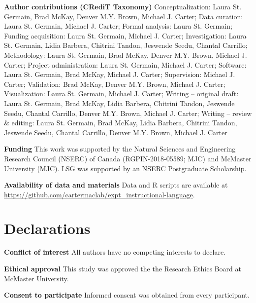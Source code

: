 \documentclass[man,floatsintext,donotrepeattitle,letterpaper,12pt]{apa7}
\begin{document}
\clearpage

\noindent \textbf{Author contributions (CRediT Taxonomy)} \hspace{0.25em} Conceptualization: Laura St. Germain, Brad McKay, Denver M.Y. Brown, Michael J. Carter; Data curation: Laura St. Germain, Michael J. Carter; Formal analysis: Laura St. Germain; Funding acquisition: Laura St. Germain, Michael J. Carter; Investigation: Laura St. Germain, Lidia Barbera, Chitrini Tandon, Jeswende Seedu, Chantal Carrillo; Methodology: Laura St. Germain, Brad McKay, Denver M.Y. Brown, Michael J. Carter; Project administration: Laura St. Germain, Michael J. Carter; Software: Laura St. Germain, Brad McKay, Michael J. Carter; Supervision: Michael J. Carter; Validation: Brad McKay, Denver M.Y. Brown, Michael J. Carter; Visualization: Laura St. Germain, Michael J. Carter; Writing -- original draft: Laura St. Germain, Brad McKay, Lidia Barbera, Chitrini Tandon, Jeswende Seedu, Chantal Carrillo, Denver M.Y. Brown, Michael J. Carter; Writing -- review \& editing: Laura St. Germain, Brad McKay, Lidia Barbera, Chitrini Tandon, Jeswende Seedu, Chantal Carrillo, Denver M.Y. Brown, Michael J. Carter

\noindent \textbf{Funding} \hspace{0.25em} This work was supported by the Natural Sciences and Engineering Research Council (NSERC) of Canada (RGPIN-2018-05589; MJC) and McMaster University (MJC). LSG was supported by an NSERC Postgraduate Scholarship.

\noindent \textbf{Availability of data and materials} \hspace{0.25em} Data and R scripts are available at \url{https://github.com/cartermaclab/expt_instructional-language}.

\section{Declarations}

\noindent \textbf{Conflict of interest} \hspace{0.25em} All authors have no competing interests to declare.

\noindent \noindent \textbf{Ethical approval} \hspace{0.25em} This study was approved the the Research Ethics Board at McMaster University.

\noindent \textbf{Consent to participate} \hspace{0.25em} Informed consent was obtained from every participant.



\printbibliography
\end{document}
